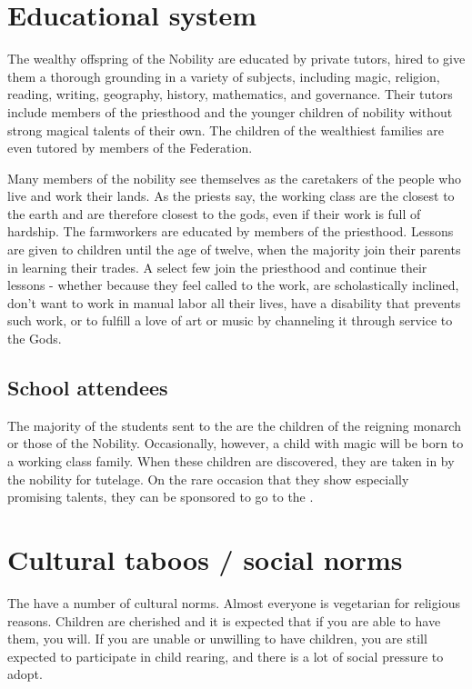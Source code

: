 \documentclass[blue]{GL2020}
\begin{document}

\section*{Educational system}

The wealthy offspring of the Nobility are educated by private tutors, hired to give them a thorough grounding in a variety of subjects, including magic, religion, reading, writing, geography, history, mathematics, and governance.  Their tutors include members of the priesthood and the younger children of nobility without strong magical talents of their own.  The children of the wealthiest families are even tutored by members of the Federation.

Many members of the nobility see themselves as the caretakers of the people who live and work their lands.  As the priests say, the working class are the closest to the earth and are therefore closest to the gods, even if their work is full of hardship.  The farmworkers are educated by members of the priesthood.  Lessons are given to children until the age of twelve, when the majority join their parents in learning their trades.  A select few join the priesthood and continue their lessons - whether because they feel called to the work, are scholastically inclined, don't want to work in manual labor all their lives, have a disability that prevents such work, or to fulfill a love of art or music by channeling it through service to the Gods.

\subsection*{School attendees}

The majority of the students sent to the \pSchool{} are the children of the reigning monarch or those of the Nobility. Occasionally, however, a child with magic will be born to a working class family.  When these children are discovered, they are taken in by the nobility for tutelage.  On the rare occasion that they show especially promising talents, they can be sponsored to go to the \pSchool{}.

\section*{Cultural taboos / social norms}
The \pFarm{} have a number of cultural norms. Almost everyone is vegetarian for religious reasons. Children are cherished and it is expected that if you are able to have them, you will. If you are unable or unwilling to have children, you are still expected to participate in child rearing, and there is a lot of social pressure to adopt.
\end{document}
